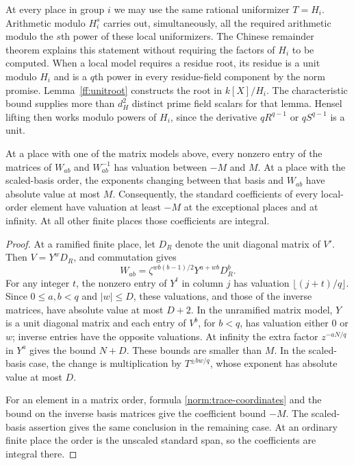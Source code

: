 At every place in group $i$ we may use the same rational uniformizer
$T=H_i$.  Arithmetic modulo $H_i^s$ carries out, simultaneously, all
the required arithmetic modulo the $s$th power of these local
uniformizers.  The Chinese remainder theorem explains this statement
without requiring the factors of $H_i$ to be computed.  When a local
model requires a residue root, its residue is a unit modulo $H_i$
and is a $q$th power in every residue-field component by the norm
promise.  Lemma~\ref{ff:unitroot} constructs the root in $k[X]/H_i$.
The characteristic bound supplies more than $d_H^2$ distinct prime
field scalars for that lemma.  Hensel lifting then works modulo powers
of $H_i$, since the derivative $qR^{q-1}$ or $qS^{q-1}$ is a unit.

\begin{lemma}\label{norm:local-bounds}
At a place with one of the matrix models above, every nonzero entry
of the matrices of $W_{ab}$ and $W_{ab}^{-1}$ has valuation between
$-M$ and $M$.  At a place with the scaled-basis order, the exponents
changing between that basis and $W_{ab}$ have absolute value at most
$M$.  Consequently, the standard coefficients of every local-order
element have valuation at least $-M$ at the exceptional places and
at infinity.  At all other finite places those coefficients are
integral.
\end{lemma}

\begin{proof}
At a ramified finite place, let $D_R$ denote the unit diagonal matrix
of $V'$.  Then $V=Y^wD_R$, and commutation gives
\[
 W_{ab}=\zeta^{wb(b-1)/2}Y^{a+wb}D_R^b.
\]
For any integer $t$, the nonzero entry of $Y^t$ in column $j$ has
valuation $\lfloor(j+t)/q\rfloor$.  Since $0\le a,b<q$ and
$|w|\le D$, these valuations, and those of the inverse matrices,
have absolute value at most $D+2$.  In the unramified matrix model,
$Y$ is a unit diagonal matrix and each entry of $V^b$, for $b<q$,
has valuation either $0$ or $w$; inverse entries have the opposite
valuations.  At infinity the extra factor $z^{-aN/q}$ in $Y^a$
gives the bound $N+D$.  These bounds are smaller than $M$.
In the scaled-basis case, the change is multiplication by
$T^{\pm bw/q}$, whose exponent has absolute value at most $D$.

For an element in a matrix order, formula
\eqref{norm:trace-coordinates} and the bound on the inverse basis
matrices give the coefficient bound $-M$.  The scaled-basis assertion
gives the same conclusion in the remaining case.  At an ordinary
finite place the order is the unscaled standard span, so the
coefficients are integral there.
\end{proof}

